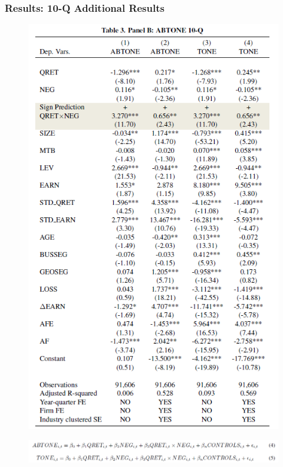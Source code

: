 \documentclass{beamer}
\begin{document}
\begin{frame}
\frametitle{Results: 10-Q Additional Results}
\begin{multicols}{2}
	\begin{figure}[h]
	\centering
	\includegraphics[width=0.79\linewidth]{tab3panB}
	\label{tab3panB}
	\end{figure}

	\begin{figure}[h]
	\centering
	\includegraphics[width=1\linewidth]{tab3panBeq}
	\label{tab3panBeq}
\end{figure}
\end{multicols}
\end{frame}
\end{document}
